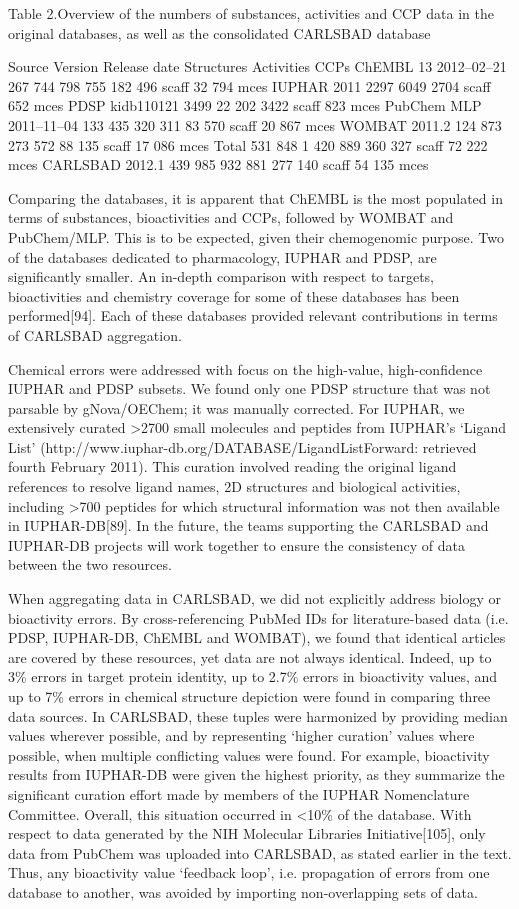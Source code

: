 Table 2.Overview of the numbers of substances, activities and CCP data in the original databases, as well as the consolidated CARLSBAD database

Source	Version	Release date	Structures	Activities	CCPs
ChEMBL 	13 	2012–02–21 	267 744 	798 755 	182 496 scaff 32 794 mces 
IUPHAR 	 	2011 	2297 	6049 	2704 scaff 652 mces 
PDSP 	kidb110121 	 	3499 	22 202 	3422 scaff 823 mces 
PubChem MLP 	 	2011–11–04 	133 435 	320 311 	83 570 scaff 20 867 mces 
WOMBAT 	2011.2 	 	124 873 	273 572 	88 135 scaff 17 086 mces 
Total 	 	 	531 848 	1 420 889 	360 327 scaff 72 222 mces 
CARLSBAD 	2012.1 	 	439 985 	932 881 	277 140 scaff 54 135 mces 

Comparing the databases, it is apparent that ChEMBL is the most populated in terms of substances, bioactivities and CCPs, followed by WOMBAT and PubChem/MLP. This is to be expected, given their chemogenomic purpose. Two of the databases dedicated to pharmacology, IUPHAR and PDSP, are significantly smaller. An in-depth comparison with respect to targets, bioactivities and chemistry coverage for some of these databases has been performed[94]. Each of these databases provided relevant contributions in terms of CARLSBAD aggregation.

Chemical errors were addressed with focus on the high-value, high-confidence IUPHAR and PDSP subsets. We found only one PDSP structure that was not parsable by gNova/OEChem; it was manually corrected. For IUPHAR, we extensively curated >2700 small molecules and peptides from IUPHAR’s ‘Ligand List’ (http://www.iuphar-db.org/DATABASE/LigandListForward: retrieved fourth February 2011). This curation involved reading the original ligand references to resolve ligand names, 2D structures and biological activities, including >700 peptides for which structural information was not then available in IUPHAR-DB[89]. In the future, the teams supporting the CARLSBAD and IUPHAR-DB projects will work together to ensure the consistency of data between the two resources.

When aggregating data in CARLSBAD, we did not explicitly address biology or bioactivity errors. By cross-referencing PubMed IDs for literature-based data (i.e. PDSP, IUPHAR-DB, ChEMBL and WOMBAT), we found that identical articles are covered by these resources, yet data are not always identical. Indeed, up to 3\% errors in target protein identity, up to 2.7\% errors in bioactivity values, and up to 7\% errors in chemical structure depiction were found in comparing three data sources. In CARLSBAD, these tuples were harmonized by providing median values wherever possible, and by representing ‘higher curation’ values where possible, when multiple conflicting values were found. For example, bioactivity results from IUPHAR-DB were given the highest priority, as they summarize the significant curation effort made by members of the IUPHAR Nomenclature Committee. Overall, this situation occurred in <10\% of the database. With respect to data generated by the NIH Molecular Libraries Initiative[105], only data from PubChem was uploaded into CARLSBAD, as stated earlier in the text. Thus, any bioactivity value ‘feedback loop’, i.e. propagation of errors from one database to another, was avoided by importing non-overlapping sets of data.

